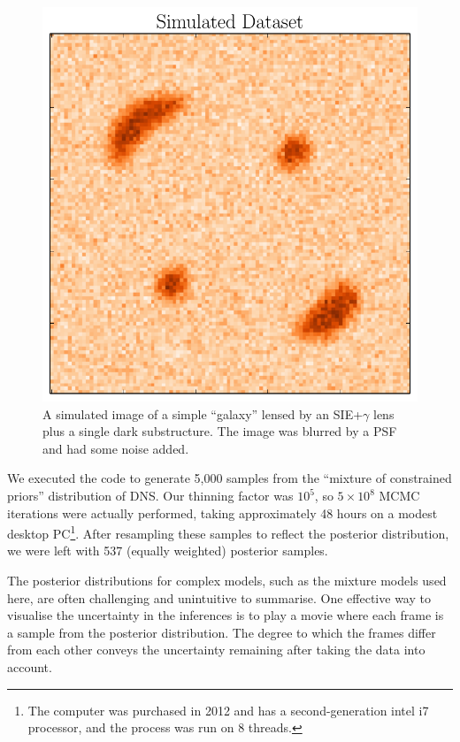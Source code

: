 \documentclass[useAMS,usenatbib]{mn2e}
\begin{document}
\begin{figure}
\begin{center}
\includegraphics[scale=0.5]{simulated_image.pdf}
\caption{A simulated image of a simple ``galaxy'' lensed by an SIE+$\gamma$
lens plus a single dark substructure. The image was blurred by a PSF and had
some noise added.\label{fig:simulated_image}}
\end{center}
\end{figure}

We executed the code to generate 5,000 samples from the ``mixture of
constrained priors'' distribution of DNS. Our thinning factor was $10^5$,
so $5 \times 10^8$ MCMC iterations were actually performed, taking approximately
48 hours on a modest desktop PC\footnote{The computer was purchased in 2012
and has a second-generation intel i7 processor, and the process was run on
8 threads.}. After resampling these samples to
reflect the posterior distribution, we were left with 537
(equally weighted) posterior samples.

The posterior distributions for complex models, such as the mixture models used here, are often challenging and unintuitive to summarise. One effective way
to visualise the uncertainty in the inferences is to play a movie where each
frame is a sample from the posterior distribution. The degree to which the
frames differ from each other conveys the uncertainty remaining after taking
the data into account.
\end{document}
